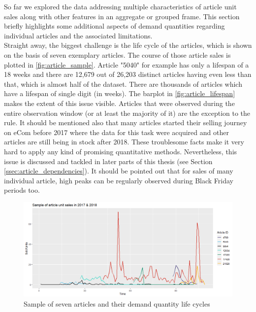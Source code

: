 

So far we explored the data addressing multiple characteristics of article unit sales along with other features in an aggregate or grouped frame. This section briefly highlights some additional aspects of demand quantities regarding individual articles and the associated limitations.
\\

Straight away, the biggest challenge is the life cycle of the articles, which is shown on the basis of seven exemplary articles. The course of those article sales is plotted in \autoref{fig:article_sample}. Article "5040" for example has only a lifespan of a 18 weeks and there are 12,679 out of 26,203 distinct articles having even less than that, which is almost half of the dataset. There are thousands of articles which have a lifespan of single digit (in weeks). The barplot in \autoref{fig:article_lifespan} makes the extent of this issue visible. Articles that were observed during the entire observation window (or at least the majority of it) are the exception to the rule. It should be mentioned also that many articles started their selling journey on eCom before 2017 where the data for this task were acquired and other articles are still being in stock after 2018. These troublesome facts make it very hard to apply any kind of promising quantitative methods. Nevertheless, this issue is discussed and tackled in later parts of this thesis (see Section \ref{ssec:article_dependencies}). It should be pointed out that for sales of many individual article, high peaks can be regularly observed during Black Friday periods too.
\\


\begin{figure}[H]
\centering
  \includegraphics[width=0.95\linewidth]{figures/article_sample.png}
  \caption{Sample of seven articles and their demand quantity life cycles}
  \label{fig:article_sample}
\end{figure}


